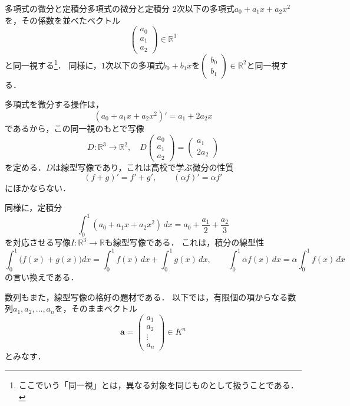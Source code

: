 \begin{example}{多項式の微分と定積分}{多項式の微分と定積分}
  $2$次以下の多項式$a_0 + a_1 x + a_2 x^2$を，その係数を並べたベクトル
  \[
    \begin{pmatrix} a_0 \\ a_1 \\ a_2 \end{pmatrix} \in \mathbb{R}^3
  \]
  と同一視する\footnote{ここでいう「同一視」とは，異なる対象を同じものとして扱うことである．}．
  同様に，$1$次以下の多項式$b_0 + b_1 x$を$\begin{pmatrix} b_0 \\ b_1 \end{pmatrix} \in \mathbb{R}^2$と同一視する．

  多項式を微分する操作は，
  \[
    (a_0 + a_1 x + a_2 x^2)' = a_1 + 2a_2 x
  \]
  であるから，この同一視のもとで写像
  \[
    D \colon \mathbb{R}^3 \to \mathbb{R}^2, \quad
    D\begin{pmatrix} a_0 \\ a_1 \\ a_2 \end{pmatrix} = \begin{pmatrix} a_1 \\ 2a_2 \end{pmatrix}
  \]
  を定める．$D$は線型写像であり，これは高校で学ぶ微分の性質
  \[
    (f + g)' = f' + g', \qquad (\alpha f)' = \alpha f'
  \]
  にほかならない．

  同様に，定積分
  \[
    \int_0^1 (a_0 + a_1 x + a_2 x^2)\,dx = a_0 + \frac{a_1}{2} + \frac{a_2}{3}
  \]
  を対応させる写像$I \colon \mathbb{R}^3 \to \mathbb{R}$も線型写像である．
  これは，積分の線型性
  \[
    \int_0^1 \bigl(f(x) + g(x)\bigr) dx = \int_0^1 f(x)\,dx + \int_0^1 g(x)\,dx, \qquad
    \int_0^1 \alpha f(x)\,dx = \alpha \int_0^1 f(x)\,dx
  \]
  の言い換えである．
\end{example}

数列もまた，線型写像の格好の題材である．
以下では，有限個の項からなる数列$a_1, a_2, \dots, a_n$を，そのままベクトル
\[
  \bm{a} = \begin{pmatrix} a_1 \\ a_2 \\ \vdots \\ a_n \end{pmatrix} \in K^n
\]
とみなす．

